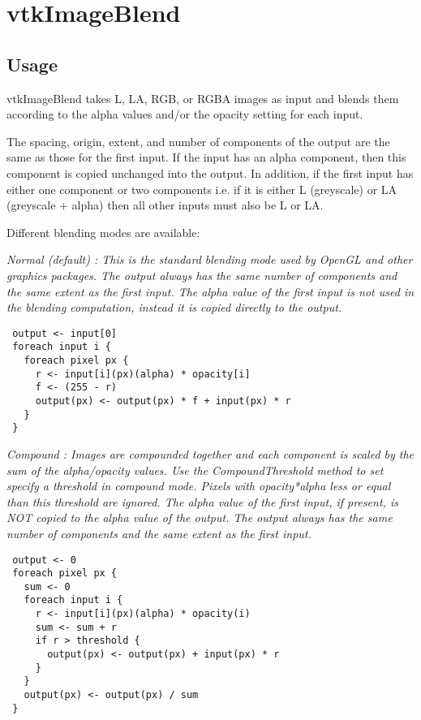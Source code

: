 \section{vtkImageBlend}

\subsection{Usage}

 vtkImageBlend takes L, LA, RGB, or RGBA images as input and blends them
 according to the alpha values and/or the opacity setting for each input.

 The spacing, origin, extent, and number of components of the output are
 the same as those for the first input.  If the input has an alpha
 component, then this component is copied unchanged into the output.
 In addition, if the first input has either one component or two
 components i.e. if it is either L (greyscale) or LA (greyscale + alpha)
 then all other inputs must also be L or LA.

 Different blending modes are available:

 \em Normal (default) :
 This is the standard blending mode used by OpenGL and other graphics
 packages.  The output always has the same number of components
 and the same extent as the first input.  The alpha value of the first
 input is not used in the blending computation, instead it is copied
 directly to the output.

 \begin{verbatim}
 output <- input[0]
 foreach input i {
   foreach pixel px {
     r <- input[i](px)(alpha) * opacity[i]
     f <- (255 - r)
     output(px) <- output(px) * f + input(px) * r
   }
 }
 \end{verbatim}

 \em Compound :
 Images are compounded together and each component is scaled by the sum of
 the alpha/opacity values. Use the CompoundThreshold method to set
 specify a threshold in compound mode. Pixels with opacity*alpha less
 or equal than this threshold are ignored.
 The alpha value of the first input, if present, is NOT copied to the alpha
 value of the output.  The output always has the same number of components
 and the same extent as the first input.

 \begin{verbatim}
 output <- 0
 foreach pixel px {
   sum <- 0
   foreach input i {
     r <- input[i](px)(alpha) * opacity(i)
     sum <- sum + r
     if r > threshold {
       output(px) <- output(px) + input(px) * r
     }
   }
   output(px) <- output(px) / sum
 }
 \end{verbatim}

